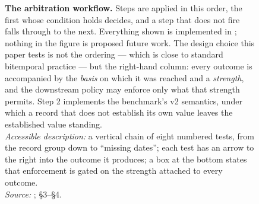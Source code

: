 \begin{figure}[t]

\vspace{1mm}
\caption[Evarb-0.2 arbitration workflow]{%
\textbf{The arbitration workflow.} Steps are applied in this order, the first whose condition holds decides, and a
step that does not fire falls through to the next. Everything shown is implemented in ;
nothing in the figure is proposed future work. The design choice this paper tests is not the ordering --- which is
close to standard bitemporal practice --- but the right-hand column: every outcome is accompanied by the
\emph{basis} on which it was reached and a \emph{strength}, and the downstream policy may enforce only what that
strength permits. Step 2 implements the benchmark's v2 semantics, under which a record that does not establish its
own value leaves the established value standing.\\
\emph{Accessible description:} a vertical chain of eight numbered tests, from the record group down to ``missing
dates''; each test has an arrow to the right into the outcome it produces; a box at the bottom states that
enforcement is gated on the strength attached to every outcome.\\
\emph{Source:} ;  \S3--\S4.}
\label{fig:workflow}
\end{figure}
